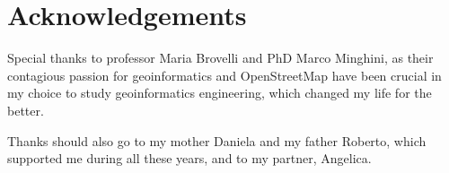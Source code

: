 \documentclass{Configuration_Files/PoliMi3i_thesis}
\begin{document}
\printbibliography


\cleardoublepage
{} %
\appendix



\listoffigures

\listofgraphs

\listoftables


\chapter*{Acknowledgements}

Special thanks to professor Maria Brovelli and PhD Marco Minghini, as their contagious passion for geoinformatics and OpenStreetMap have been crucial in my choice to study geoinformatics engineering, which changed my life for the better.

Thanks should also go to my mother Daniela and my father Roberto, which supported me during all these years, and to my partner, Angelica.

\cleardoublepage
\end{document}
